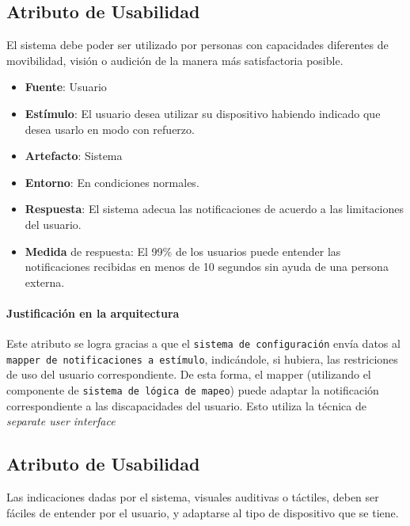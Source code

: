 \subsection{Atributo de Usabilidad}
El sistema debe poder ser utilizado por personas con capacidades diferentes de movibilidad, visión o audición de la manera más satisfactoria posible.

\begin{itemize}
  \item \textbf{Fuente}: Usuario
  \item \textbf{Estímulo}: El usuario desea utilizar su dispositivo habiendo indicado que desea usarlo en modo con refuerzo.
  \item \textbf{Artefacto}: Sistema
  \item \textbf{Entorno}: En condiciones normales.
  \item \textbf{Respuesta}: El sistema adecua las notificaciones de acuerdo a las limitaciones del usuario.
  \item \textbf{Medida} de respuesta: El 99\% de los usuarios puede entender las notificaciones recibidas en menos de 10 segundos sin ayuda de una persona externa.
\end{itemize}

\paragraph{Justificación en la arquitectura}
Este atributo se logra gracias a que el \texttt{sistema de configuración} envía datos al \texttt{mapper de notificaciones a estímulo}, indicándole, si hubiera, las restriciones de uso del usuario correspondiente. De esta forma, el mapper (utilizando el componente de \texttt{sistema de lógica de mapeo}) puede adaptar la notificación correspondiente a las discapacidades del usuario. Esto utiliza la técnica de \emph{separate user interface}


\subsection{Atributo de Usabilidad}
Las indicaciones dadas por el sistema, visuales auditivas o táctiles, deben ser fáciles de entender por el usuario, y adaptarse al tipo de dispositivo que se tiene.


